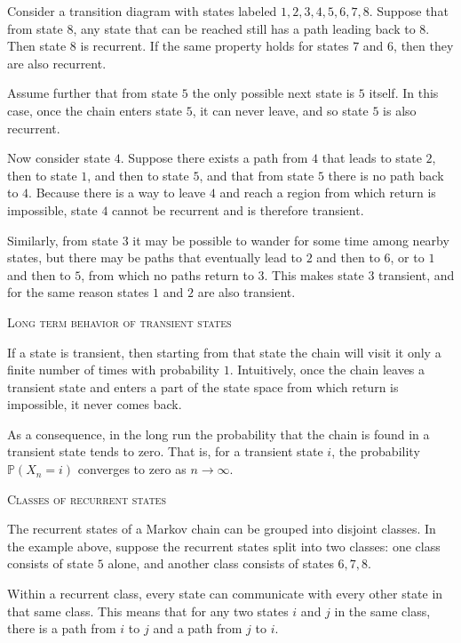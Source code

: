 Consider a transition diagram with states labeled \(1,2,3,4,5,6,7,8\).
Suppose that from state \(8\), any state that can be reached still has a path leading back to \(8\).
Then state \(8\) is recurrent.
If the same property holds for states \(7\) and \(6\), then they are also recurrent.

Assume further that from state \(5\) the only possible next state is \(5\) itself.
In this case, once the chain enters state \(5\), it can never leave, and so state \(5\) is also recurrent.

Now consider state \(4\).
Suppose there exists a path from \(4\) that leads to state \(2\), then to state \(1\), and then to state \(5\), and that from state \(5\) there is no path back to \(4\).
Because there is a way to leave \(4\) and reach a region from which return is impossible, state \(4\) cannot be recurrent and is therefore transient.

Similarly, from state \(3\) it may be possible to wander for some time among nearby states, but there may be paths that eventually lead to \(2\) and then to \(6\), or to \(1\) and then to \(5\), from which no paths return to \(3\).
This makes state \(3\) transient, and for the same reason states \(1\) and \(2\) are also transient.

\bigskip
\textsc{Long term behavior of transient states}

If a state is transient, then starting from that state the chain will visit it only a finite number of times with probability \(1\).
Intuitively, once the chain leaves a transient state and enters a part of the state space from which return is impossible, it never comes back.

As a consequence, in the long run the probability that the chain is found in a transient state tends to zero.
That is, for a transient state \(i\), the probability \(\mathbb{P}(X_n = i)\) converges to zero as \(n \to \infty\).

\bigskip
\textsc{Classes of recurrent states}

The recurrent states of a Markov chain can be grouped into disjoint classes.
In the example above, suppose the recurrent states split into two classes: one class consists of state \(5\) alone, and another class consists of states \(6,7,8\).

Within a recurrent class, every state can communicate with every other state in that same class.
This means that for any two states \(i\) and \(j\) in the same class, there is a path from \(i\) to \(j\) and a path from \(j\) to \(i\).

